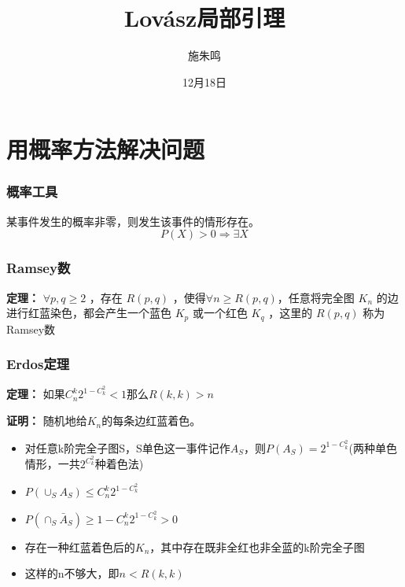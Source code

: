 \documentclass[AutoFakeBold]{beamer}
\title{Lovász局部引理}
\author{施朱鸣}
\date{12月18日}
\begin{document}
    {
    
    \begin{frame}
    \titlepage
    \end{frame}
    
    \section{用概率方法解决问题}
    \begin{frame}
        \frametitle{概率工具}
    
        某事件发生的概率非零，则发生该事件的情形存在。
        \[P(X)>0\Rightarrow \exists X\]

    \end{frame}

    \begin{frame}
        \frametitle{Ramsey数}
    
        \textbf{定理：} \(\forall p,q\geq 2\) ，存在 \(R(p,q)\) ，使得\(\forall n \geq R(p,q)\)，任意将完全图 \(K_n\) 的边进行红蓝染色，都会产生一个蓝色 \(K_p\) 或一个红色 \(K_q\) ，这里的 \(R(p,q)\) 称为Ramsey数


    
    \end{frame}

    \begin{frame}
        \frametitle{Erdos定理}
    
        \textbf{定理：} 如果\(C_n^k2^{1-C_k^2}<1\)那么\(R(k,k)>n\)

        \textbf{证明：} 随机地给\(K_n\)的每条边红蓝着色。

        \begin{itemize}
            \item 对任意k阶完全子图S，S单色这一事件记作\(A_S\)，则\(P(A_S)=2^{1-C_k^2}\)(两种单色情形，一共\(2^{C_k^2}\)种着色法)
            \item \(P(\cup_S A_S)\leq C_n^k2^{1-C_k^2}\)
            \item \(P(\cap_S \bar{A}_S)\geq 1-C_n^k2^{1-C_k^2} > 0\)
            \item 存在一种红蓝着色后的\(K_n\)，其中存在既非全红也非全蓝的k阶完全子图
            \item 这样的n不够大，即\(n<R(k,k)\)
        \end{itemize}
    

\end{frame}}
\end{document}
